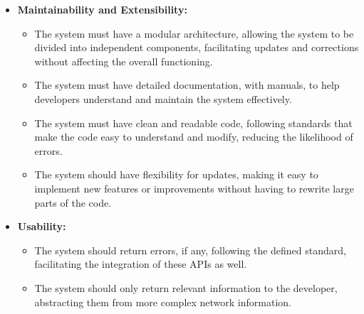 \begin{itemize}
\begin{itemize}
		      \item The system must ensure that APIs follow open standards and best
		            practices, promoting interoperability and universal acceptance between
		            different systems and technologies.
	      \end{itemize}


	\item \textbf{Maintainability and Extensibility:}
	      \begin{itemize}
		      \item The system must have a modular architecture, allowing the system to
		            be divided into independent components, facilitating updates and
		            corrections without affecting the overall functioning.

		      \item The system must have detailed documentation, with manuals, to help
		            developers understand and maintain the system effectively.

		      \item The system must have clean and readable code, following standards
		            that make the code easy to understand and modify, reducing the
		            likelihood of errors.

		      \item The system should have flexibility for updates, making it easy to
		            implement new features or improvements without having to rewrite large
		            parts of the code.
	      \end{itemize}

	\item \textbf{Usability:}
	      \begin{itemize}
		      \item The system should return errors, if any, following the defined
		            standard, facilitating the integration of these APIs as well.

		      \item The system should only return relevant information to the
		            developer, abstracting them from more complex network information.
	      \end{itemize}
\end{itemize}
